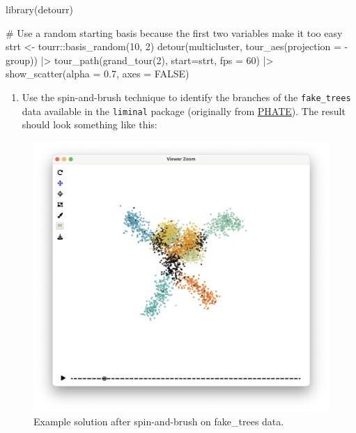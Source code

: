 \documentclass[
  letterpaper,
]{krantz}
\newenvironment{Shaded}{\begin{snugshade}}{\end{snugshade}}
\newcommand{\AttributeTok}[1]{\textcolor[rgb]{0.40,0.45,0.13}{#1}}
\newcommand{\CommentTok}[1]{\textcolor[rgb]{0.37,0.37,0.37}{#1}}
\newcommand{\ConstantTok}[1]{\textcolor[rgb]{0.56,0.35,0.01}{#1}}
\newcommand{\DecValTok}[1]{\textcolor[rgb]{0.68,0.00,0.00}{#1}}
\newcommand{\FloatTok}[1]{\textcolor[rgb]{0.68,0.00,0.00}{#1}}
\newcommand{\FunctionTok}[1]{\textcolor[rgb]{0.28,0.35,0.67}{#1}}
\newcommand{\NormalTok}[1]{\textcolor[rgb]{0.00,0.23,0.31}{#1}}
\newcommand{\OtherTok}[1]{\textcolor[rgb]{0.00,0.23,0.31}{#1}}
\newcommand{\SpecialCharTok}[1]{\textcolor[rgb]{0.37,0.37,0.37}{#1}}
\providecommand{\tightlist}{%
  \setlength{\itemsep}{0pt}\setlength{\parskip}{0pt}}\usepackage{longtable,booktabs,array}
\begin{document}
\begin{Shaded}
\begin{Highlighting}[]
\FunctionTok{library}\NormalTok{(detourr)}

\CommentTok{\# Use a random starting basis because the first two variables make it too easy}
\NormalTok{strt }\OtherTok{\textless{}{-}}\NormalTok{ tourr}\SpecialCharTok{::}\FunctionTok{basis\_random}\NormalTok{(}\DecValTok{10}\NormalTok{, }\DecValTok{2}\NormalTok{)}
\FunctionTok{detour}\NormalTok{(multicluster, }
       \FunctionTok{tour\_aes}\NormalTok{(}\AttributeTok{projection =} \SpecialCharTok{{-}}\NormalTok{group)) }\SpecialCharTok{|\textgreater{}}
       \FunctionTok{tour\_path}\NormalTok{(}\FunctionTok{grand\_tour}\NormalTok{(}\DecValTok{2}\NormalTok{), }\AttributeTok{start=}\NormalTok{strt, }\AttributeTok{fps =} \DecValTok{60}\NormalTok{) }\SpecialCharTok{|\textgreater{}}
       \FunctionTok{show\_scatter}\NormalTok{(}\AttributeTok{alpha =} \FloatTok{0.7}\NormalTok{, }\AttributeTok{axes =} \ConstantTok{FALSE}\NormalTok{)}
\end{Highlighting}
\end{Shaded}

\begin{enumerate}
\def\labelenumi{\arabic{enumi}.}
\setcounter{enumi}{2}
\tightlist
\item
  Use the spin-and-brush technique to identify the branches of the
  \texttt{fake\_trees} data available in the \texttt{liminal} package
  (originally from
  \href{https://phate.readthedocs.io/en/stable/}{PHATE}). The result
  should look something like this:
\end{enumerate}

\begin{figure}

{\centering \includegraphics{images/fake_trees_sb.png}

}

\caption{\label{fig-fake-trees-sb}Example solution after spin-and-brush
on fake\_trees data.}

\end{figure}
\end{document}

